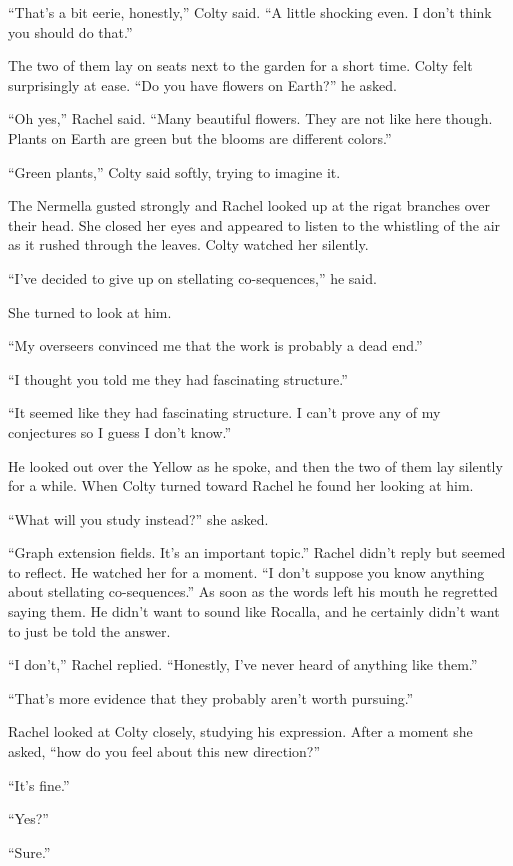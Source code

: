 ``That's a bit eerie, honestly,'' Colty said. ``A little shocking even. I don't think you should
do that.''

The two of them lay on seats next to the garden for a short time. Colty felt surprisingly at
ease. ``Do you have flowers on Earth?'' he asked.

``Oh yes,'' Rachel said. ``Many beautiful flowers. They are not like here though. Plants on
Earth are green but the blooms are different colors.''

``Green plants,'' Colty said softly, trying to imagine it.

The Nermella gusted strongly and Rachel looked up at the rigat branches over their head. She
closed her eyes and appeared to listen to the whistling of the air as it rushed through the
leaves. Colty watched her silently.

``I've decided to give up on stellating co-sequences,'' he said.

She turned to look at him.

``My overseers convinced me that the work is probably a dead end.''

``I thought you told me they had fascinating structure.''

``It seemed like they had fascinating structure. I can't prove any of my conjectures so I guess
I don't know.''

He looked out over the Yellow as he spoke, and then the two of them lay silently for a while.
When Colty turned toward Rachel he found her looking at him.

``What will you study instead?'' she asked.

``Graph extension fields. It's an important topic.'' Rachel didn't reply but seemed to reflect.
He watched her for a moment. ``I don't suppose you know anything about stellating
co-sequences.'' As soon as the words left his mouth he regretted saying them. He didn't want to
sound like Rocalla, and he certainly didn't want to just be told the answer.

``I don't,'' Rachel replied. ``Honestly, I've never heard of anything like them.''

``That's more evidence that they probably aren't worth pursuing.''

Rachel looked at Colty closely, studying his expression. After a moment she asked, ``how do you
feel about this new direction?''

``It's fine.''

``Yes?''

``Sure.''

